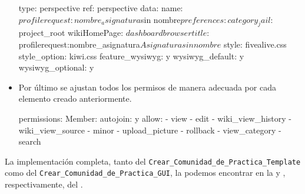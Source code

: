 \begin{itemize}
\begin{pyglist}[language=text]
  type: perspective
    ref: perspective
    data:
     name: $profilerequest:nombre_asignatura$sin nombre$
     preferences:
      category_jail: $project_root
      wikiHomePage: $dashboard
      browsertitle: $profilerequest:nombre_asignatura$Asignatura sin nombre$
      style: fivealive.css
      style_option: kiwi.css
      feature_wysiwyg: y
      wysiwyg_default: y
      wysiwyg_optional: y
\end{pyglist}

\item Por último se ajustan todos los permisos de manera adecuada por cada elemento creado anteriormente.

\begin{pyglist}[language=text]
  permissions:
   Member:
    autojoin: y
    allow:
        - view
        - edit
        - wiki_view_history
        - wiki_view_source
        - minor
        - upload_picture
        - rollback
        - view_category
        - search
\end{pyglist}
\end{itemize}

La implementación completa, tanto del \profile{} \texttt{Crear\_Comunidad\_de\_Practica\_Template} como del \texttt{Crear\_Comunidad\_de\_Practica\_GUI}, la podemos encontrar en la  y , respectivamente, del .
